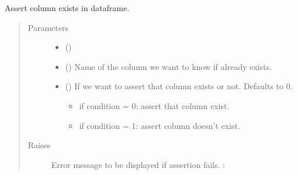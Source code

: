 \documentclass[letterpaper,10pt,english]{sphinxmanual}
\begin{document}
\begin{fulllineitems}
\label{\detokenize{source/optimization.datatools:optimization.datatools.dataprep.column_exists}}
Assert column exists in dataframe.
\begin{quote}\begin{description}
\item[{Parameters}] \leavevmode\begin{itemize}
\item {} 
 () \textendash{} 

\item {} 
 () \textendash{} Name of the column we want to know if already exists.

\item {} 
 () \textendash{} 
If we want to assert that column exists or not. Defaults to 0.
\begin{itemize}
\item {} 
if condition = 0: assert that column exist.

\item {} 
if condition = 1: assert column doesn’t exist.

\end{itemize}


\end{itemize}

\item[{Raises}] \leavevmode
{} \textendash{} Error message to be displayed if assertion fails. :

\end{description}\end{quote}

\end{fulllineitems}

\end{document}

